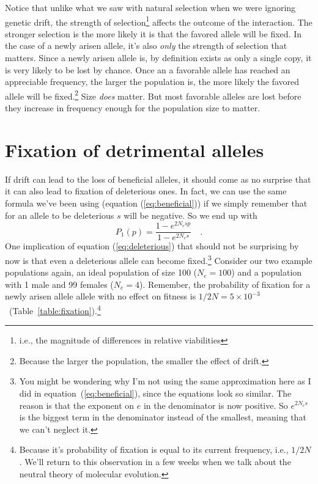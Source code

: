 Notice that unlike what we saw with natural selection when we were
ignoring genetic drift, the strength of selection\footnote{i.e., the
  magnitude of differences in relative viabilities} affects the
outcome of the interaction. The stronger selection is the more likely
it is that the favored allele will be fixed. In the case of a newly
arisen allele, it's also {\it only\/} the strength of selection that
matters. Since a newly arisen allele is, by definition exists as only
a single copy, it is very likely to be lost by chance. Once an a
favorable allele has reached an appreciable frequency, the larger the
population is, the more likely the favored allele will be
fixed.\footnote{Because the larger the population, the smaller the
  effect of drift.} Size {\it does\/} matter. But most favorable
alleles are lost before they increase in frequency enough for the
population size to matter.

\section*{Fixation of detrimental alleles}

If drift can lead to the loss of beneficial alleles, it should come as
no surprise that it can also lead to fixation of deleterious ones. In
fact, we can use the same formula we've been using (equation
(\ref{eq:beneficial})) if we simply remember that for an allele to be
deleterious $s$ will be negative. So we end up with
\begin{equation}
P_1(p) = \frac{1 - e^{2N_esp}}{1 - e^{2N_es}} \quad .
\label{eq:deleterious}
\end{equation}
One implication of equation (\ref{eq:deleterious}) that should not be
surprising by now is that even a deleterious allele can become
fixed.\footnote{You might be wondering why I'm not using the same
  approximation here as I did in equation~(\ref{eq:beneficial}), since
  the equations look so similar. The reason is that the exponent on
  $e$ in the denominator is now positive. So $e^{2N_es}$ is the
  biggest term in the denominator instead of the smallest, meaning
  that we can't neglect it.} Consider our two example populations
again, an ideal population of size 100 ($N_e = 100$) and a population
with 1 male and 99 females ($N_e = 4$). Remember, the probability of
fixation for a newly arisen allele allele with no effect on fitness is
$1/2N = 5 \times
10^{-3}$~(Table~\ref{table:fixation}).\footnote{Because
  it's probability of fixation is equal to its current frequency,
  i.e., $1/2N$. We'll return to this observation in a few weeks when
  we talk about the neutral theory of molecular evolution.}

